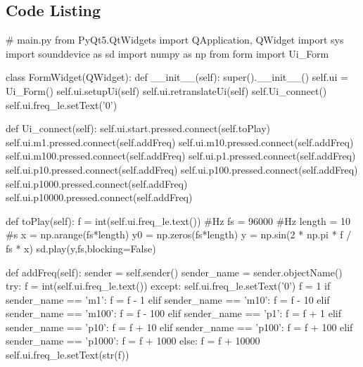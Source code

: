 \documentclass{article}
\begin{document}



\begin{appendices}
    \section{Code Listing}
    \begin{python}
    # main.py
    from PyQt5.QtWidgets import QApplication, QWidget
    import sys
    import sounddevice as sd
    import numpy as np
    from form import Ui_Form

    class FormWidget(QWidget):
        def __init__(self):
            super().__init__()
            self.ui = Ui_Form()
            self.ui.setupUi(self)
            self.ui.retranslateUi(self)
            self.Ui_connect()
            self.ui.freq_le.setText('0')
        
        def Ui_connect(self):
            self.ui.start.pressed.connect(self.toPlay)
            self.ui.m1.pressed.connect(self.addFreq)
            self.ui.m10.pressed.connect(self.addFreq)
            self.ui.m100.pressed.connect(self.addFreq)
            self.ui.p1.pressed.connect(self.addFreq)
            self.ui.p10.pressed.connect(self.addFreq)
            self.ui.p100.pressed.connect(self.addFreq)
            self.ui.p1000.pressed.connect(self.addFreq)
            self.ui.p10000.pressed.connect(self.addFreq)

        def toPlay(self):
            f = int(self.ui.freq_le.text()) #Hz
            fs = 96000 #Hz
            length = 10 #s
            x = np.arange(fs*length)
            y0 = np.zeros(fs*length)
            y = np.sin(2 * np.pi * f / fs * x)
            sd.play(y,fs,blocking=False)
            
        def addFreq(self):
            sender = self.sender()
            sender_name = sender.objectName()
            try:
                f = int(self.ui.freq_le.text())
            except:
                self.ui.freq_le.setText('0')
                f = 1
            if sender_name == 'm1':
                f = f - 1
            elif sender_name == 'm10':
                f = f - 10
            elif sender_name == 'm100':
                f = f - 100
            elif sender_name == 'p1':
                f = f + 1
            elif sender_name == 'p10':
                f = f + 10
            elif sender_name == 'p100':
                f = f + 100
            elif sender_name == 'p1000':
                f = f + 1000
            else:
                f = f + 10000
            self.ui.freq_le.setText(str(f))
            


\end{python}
\end{appendices}
\end{document}
